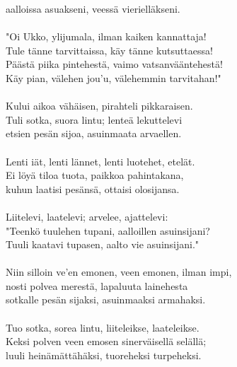 aalloissa asuakseni, veessä vierielläkseni.                 \\
                                                            \\
"Oi Ukko, ylijumala, ilman kaiken kannattaja!               \\
Tule tänne tarvittaissa, käy tänne kutsuttaessa!            \\
Päästä piika pintehestä, vaimo vatsanvääntehestä!           \\
Käy pian, välehen jou'u, välehemmin tarvitahan!"            \\
                                                            \\
Kului aikoa vähäisen, pirahteli pikkaraisen.                \\
Tuli sotka, suora lintu; lenteä lekuttelevi                 \\
etsien pesän sijoa, asuinmaata arvaellen.                   \\
                                                            \\
Lenti iät, lenti lännet, lenti luotehet, etelät.            \\
Ei löyä tiloa tuota, paikkoa pahintakana,                   \\
kuhun laatisi pesänsä, ottaisi olosijansa.                  \\
                                                            \\
Liitelevi, laatelevi; arvelee, ajattelevi:                  \\
"Teenkö tuulehen tupani, aalloillen asuinsijani?            \\
Tuuli kaatavi tupasen, aalto vie asuinsijani."              \\
                                                            \\
Niin silloin ve'en emonen, veen emonen, ilman impi,         \\
nosti polvea merestä, lapaluuta lainehesta                  \\
sotkalle pesän sijaksi, asuinmaaksi armahaksi.              \\
                                                            \\
Tuo sotka, sorea lintu, liiteleikse, laateleikse.           \\
Keksi polven veen emosen sinerväisellä selällä;             \\
luuli heinämättähäksi, tuoreheksi turpeheksi.               \\
